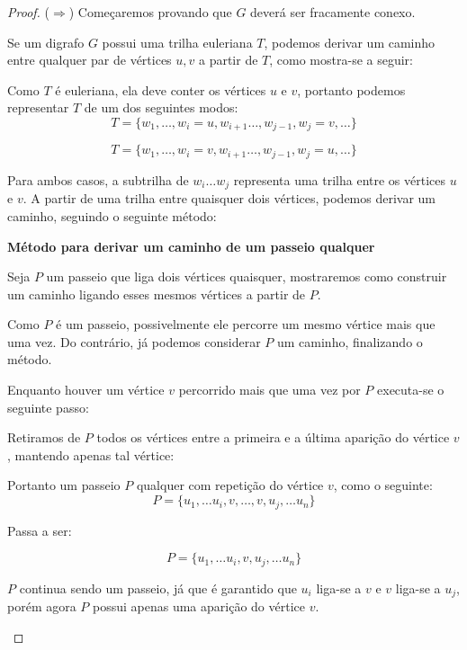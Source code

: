 \documentclass[12pt, a4paper]{article}
\begin{document}
\begin{proof} 

    ($\Rightarrow$) Começaremos provando que $G$ deverá ser fracamente conexo.

    Se um digrafo $G$ possui uma trilha euleriana $T$, podemos derivar um caminho entre qualquer par de vértices $u, v$ a partir de $T$, como mostra-se a seguir: 
    
    Como $T$ é euleriana, ela deve conter os vértices $u$ e $v$, portanto podemos representar $T$ de um dos seguintes modos:
    \[ T = \{w_1, \dots, w_i = u, w_{i+1} \dots, w_{j-1}, w_j = v, \dots \}\]

    \[ T = \{w_1, \dots, w_i = v, w_{i+1} \dots, w_{j-1}, w_j = u, \dots \}\]

    Para ambos casos, a subtrilha de $w_i \dots w_j$ representa uma trilha entre os vértices $u$ e $v$. 
    A partir de uma trilha entre quaisquer dois vértices, podemos derivar um caminho, seguindo o seguinte método:


        \begin{tcolorbox}
            \textbf{Método para derivar um caminho de um passeio qualquer}
            
            Seja $P$ um passeio que liga dois vértices quaisquer, mostraremos como construir um caminho ligando esses mesmos vértices a partir de $P$.

            Como $P$ é um passeio, possivelmente ele percorre um mesmo vértice mais que uma vez. Do contrário, já podemos considerar $P$ um caminho, finalizando o método. 

            Enquanto houver um vértice $v$ percorrido mais que uma vez por $P$ executa-se o seguinte passo:
    

            Retiramos de $P$ todos os vértices entre a primeira e a última aparição do vértice $v$, mantendo apenas tal vértice: 


            Portanto um passeio $P$ qualquer com repetição do vértice $v$, como o seguinte:
            \[
                P = \{ u_1, \dots u_i, v, \dots, v, u_j, \dots u_n\}
            \]

            Passa a ser:


            \[
                P = \{ u_1, \dots u_i, v, u_j, \dots u_n\}
            \]

            $P$ continua sendo um passeio, já que é garantido que $u_i$ liga-se a $v$ e $v$ liga-se a $u_j$, porém agora $P$ possui apenas uma aparição do vértice $v$.


\end{tcolorbox}
\end{proof}
\end{document}
